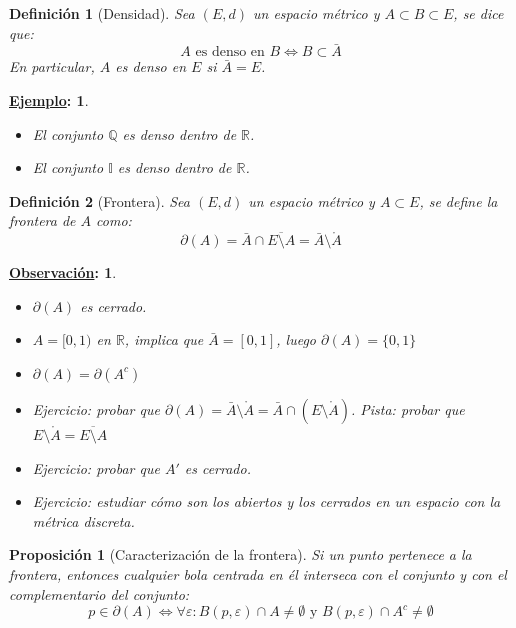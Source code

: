\documentclass[10pt,a4paper,openright]{book}
\theoremstyle{break}
\newtheorem*{defi}{Definición}
\newtheorem*{prop}{Proposición}
\newtheorem*{obs}{\underline{Observación}:}
\newtheorem*{ej}{\underline{Ejemplo}:}
\begin{document}
\begin{defi}[Densidad]
Sea $(E,d)$ un espacio métrico y $A\subset B \subset E$, se dice que:
$$A \mbox{ es denso en }B \Leftrightarrow B\subset \bar{A}$$
En particular, $A$ es denso en $E$ si $\bar{A} = E$.
\end{defi}

\begin{ej}
\begin{itemize}
\item El conjunto $\mathbb{Q}$ es denso dentro de $\mathbb{R}$.
\item El conjunto $\mathbb{I}$ es denso dentro de $\mathbb{R}$.
\end{itemize}
\end{ej}

\begin{defi}[Frontera]
Sea $(E,d)$ un espacio métrico y $A\subset E$, se define la frontera de $A$ como:
$$\partial(A) = \bar{A}\cap \overline{E\setminus{A}} = \bar{A}\setminus{\mathring{A}}$$
\end{defi}

\begin{obs}
\begin{itemize}
\item $\partial(A)$ es cerrado.
\item $A=[0,1)$ en $\mathbb{R}$, implica que $\bar{A} = [0,1]$, luego $\partial(A) = \{0,1\}$
\item $\partial(A) = \partial(A^c)$
\item Ejercicio: probar que $\partial(A)=\bar{A}\setminus{\mathring{A}} = \bar{A}\cap (E\setminus{\mathring{A}})$. Pista: probar que $E\setminus{{\mathring{A}}} = \overline{E\setminus{A}}$
\item Ejercicio: probar que $A'$ es cerrado.
\item Ejercicio: estudiar cómo son los abiertos y los cerrados en un espacio con la métrica discreta.
\end{itemize}
\end{obs}

\begin{prop}[Caracterización de la frontera]
Si un punto pertenece a la frontera, entonces cualquier bola centrada en él interseca con el conjunto y con el complementario del conjunto:
$$p\in \partial(A) \Leftrightarrow \forall \varepsilon: B(p,\varepsilon)\cap A \neq \emptyset \mbox{ y } B(p,\varepsilon)\cap A^c \neq \emptyset$$
\end{prop}
\end{document}
